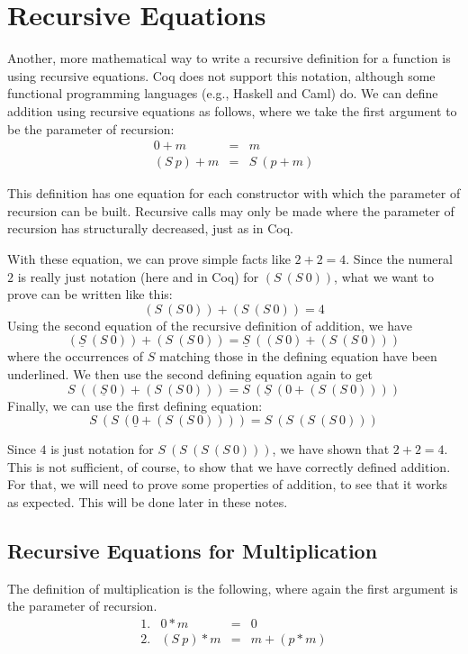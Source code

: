 \documentclass{book}[12pt]
\begin{document}
\section{Recursive Equations}
\label{sec:receqns}

Another, more mathematical way to write a recursive definition for a
function is using recursive equations.  Coq does not support this
notation, although some functional programming languages (e.g.,
Haskell and Caml) do.  We can define addition using recursive
equations as follows, where we take the first argument to be the
parameter of recursion:
\begin{eqnarray*}
0 + m &=& m \\
(S\ p) + m &=& S\ (p + m)
\end{eqnarray*}

\noindent This definition has one equation for each constructor with
which the parameter of recursion can be built.  Recursive calls may
only be made where the parameter of recursion has structurally
decreased, just as in Coq.

With these equation, we can prove simple facts like $2+2=4$.  Since
the numeral $2$ is really just notation (here and in Coq) for $(S\ (S\ 0))$,
what we want to prove can be written like this:
\[
(S\ (S\ 0)) + (S\ (S\ 0)) = 4
\]
Using the second equation of the recursive definition of addition, we have
\[
(\underline{S}\ (S\ 0)) + (S\ (S\ 0)) = 
\underline{S}\ ((S\ 0) + (S\ (S\ 0)))
\]
where the occurrences of $S$ matching those in the defining equation
have been underlined.  We then use the second defining equation again
to get
\[
S\ ((\underline{S}\ 0) + (S\ (S\ 0))) = 
S\ (\underline{S}\ (0 + (S\ (S\ 0))))
\]
Finally, we can use the first defining equation:
\[
S\ (S\ (\underline{0} + (S\ (S\ 0)))) = S\ (S\ (S\ (S\ 0)))
\]

Since $4$ is just notation for $S\ (S\ (S\ (S\ 0)))$, we have shown
that $2+2=4$.  This is not sufficient, of course, to show that we have
correctly defined addition.  For that, we will need to prove some
properties of addition, to see that it works as expected.  This will
be done later in these notes.

\subsection{Recursive Equations for Multiplication}

The definition of multiplication is the following, where again the
first argument is the parameter of recursion.
\[
\begin{array}{llll}
1. & 0 * m &=& 0 \\
2. & (S\ p) * m &=& m + (p * m)
\end{array}
\]
\end{document}
